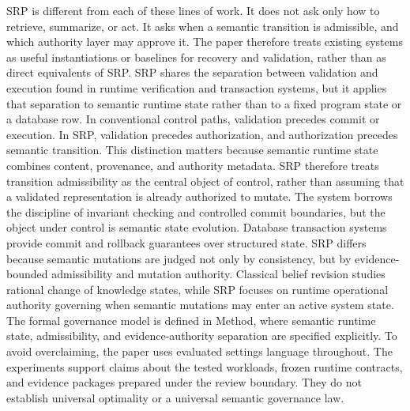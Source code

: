 {}SRP is different from each of these lines of work. It does not ask only how to retrieve, summarize, or act. It asks when a semantic transition is admissible, and which authority layer may approve it. The paper therefore treats existing systems as useful instantiations or baselines for recovery and validation, rather than as direct equivalents of SRP.\markdownRendererInterblockSeparator
{}
\markdownRendererSectionEnd \markdownRendererSectionBegin
{}\markdownRendererInterblockSeparator
{}SRP shares the separation between validation and execution found in runtime verification and transaction systems, but it applies that separation to semantic runtime state rather than to a fixed program state or a database row. In conventional control paths, validation precedes commit or execution. In SRP, validation precedes authorization, and authorization precedes semantic transition.\markdownRendererParagraphSeparator
{}This distinction matters because semantic runtime state combines content, provenance, and authority metadata. SRP therefore treats transition admissibility as the central object of control, rather than assuming that a validated representation is already authorized to mutate. The system borrows the discipline of invariant checking and controlled commit boundaries, but the object under control is semantic state evolution.\markdownRendererParagraphSeparator
{}Database transaction systems provide commit and rollback guarantees over structured state. SRP differs because semantic mutations are judged not only by consistency, but by evidence-bounded admissibility and mutation authority. Classical belief revision studies rational change of knowledge states, while SRP focuses on runtime operational authority governing when semantic mutations may enter an active system state.\markdownRendererParagraphSeparator
{}The formal governance model is defined in Method, where semantic runtime state, admissibility, and evidence-authority separation are specified explicitly.\markdownRendererInterblockSeparator
{}
\markdownRendererSectionEnd \markdownRendererSectionBegin
{}\markdownRendererInterblockSeparator
{}To avoid overclaiming, the paper uses evaluated settings language throughout. The experiments support claims about the tested workloads, frozen runtime contracts, and evidence packages prepared under the review boundary. They do not establish universal optimality or a universal semantic governance law.\markdownRendererInterblockSeparator
